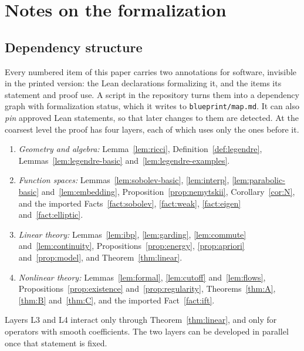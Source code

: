 \documentclass[11pt,reqno]{amsart}
\theoremstyle{definition}
\theoremstyle{remark}
\numberwithin{equation}{section}
\begin{document}
\section{Notes on the formalization}\label{sec:formal}

\subsection{Dependency structure}

Every numbered item of this paper carries two annotations for software, invisible in the printed
version: the Lean declarations formalizing it, and the items its statement and proof use.
A script in the repository turns them into a dependency graph with formalization status, which it
writes to \texttt{blueprint/map.md}. It can also \emph{pin} approved Lean statements, so
that later changes to them are detected. At the coarsest level the proof has four layers, each of
which uses only the ones before it.

\begin{enumerate}[label=\textbf{L\arabic*}]
\item \emph{Geometry and algebra:} Lemma~\ref{lem:ricci}, Definition~\ref{def:legendre},
  Lemmas~\ref{lem:legendre-basic} and~\ref{lem:legendre-examples}.
\item \emph{Function spaces:} Lemmas~\ref{lem:sobolev-basic}, \ref{lem:interp},
  \ref{lem:parabolic-basic} and~\ref{lem:embedding}, Proposition~\ref{prop:nemytskii},
  Corollary~\ref{cor:N}, and the imported
  Facts~\ref{fact:sobolev}, \ref{fact:weak}, \ref{fact:eigen} and~\ref{fact:elliptic}.
\item \emph{Linear theory:} Lemmas~\ref{lem:ibp}, \ref{lem:garding}, \ref{lem:commute}
  and~\ref{lem:continuity}, Propositions~\ref{prop:energy}, \ref{prop:apriori}
  and~\ref{prop:model}, and Theorem~\ref{thm:linear}.
\item \emph{Nonlinear theory:} Lemmas~\ref{lem:formal}, \ref{lem:cutoff} and~\ref{lem:flows},
  Propositions~\ref{prop:existence} and~\ref{prop:regularity}, Theorems~\ref{thm:A},
  \ref{thm:B} and~\ref{thm:C}, and the imported Fact~\ref{fact:ift}.
\end{enumerate}

Layers L3 and L4 interact only through Theorem~\ref{thm:linear}, and only for operators with smooth
coefficients. The two layers can be developed in parallel once that statement is fixed.
\end{document}
